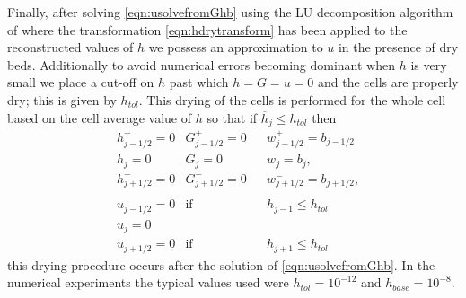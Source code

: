 Finally, after solving \eqref{eqn:usolvefromGhb} using the LU decomposition algorithm of \citet{NumRecC-1996} where the transformation \eqref{eqn:hdrytransform} has been applied to the reconstructed values of $h$ we possess an approximation to $u$ in the presence of dry beds. Additionally to avoid numerical errors becoming dominant when $h$ is very small we place a cut-off on $h$ past which $h=G= u = 0$ and the cells are properly dry; this is given by $h_{tol}$. This drying of the cells is performed for the whole cell based on the cell average value of $h$ so that if $\overline{h}_j \le h_{tol}$ then
\begin{align*}
 & 	h^+_{j-1/2}  = 0   & 	G^+_{j-1/2}  = 0  & & 	w^+_{j-1/2}  = b_{j-1/2}   \\
 &	h_{j} = 0 & 	G_{j}  = 0  & 	&w_{j}  = b_{j},\\
 & 	h^-_{j+1/2}  = 0  & 	G^-_{j+1/2}  = 0 & 	&w^-_{j+1/2}  = b_{j+1/2}  ,  \\\\
 & 	u_{j-1/2}  = 0  &\text{if}& &h_{j-1}\le h_{tol} \\
 & 	u_{j}  = 0 \\
 & 	u_{j+1/2}  = 0  &\text{if}& &h_{j+1} \le h_{tol}
\end{align*}
this drying procedure occurs after the solution of \eqref{eqn:usolvefromGhb}. In the numerical experiments the typical values used were $h_{tol} = 10^{-12}$ and $h_{base} = 10^{-8}$.
